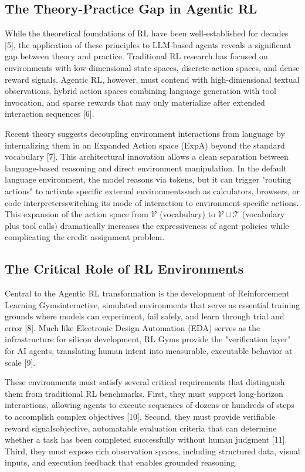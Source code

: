 \subsection{The Theory-Practice Gap in Agentic RL}

While the theoretical foundations of RL have been well-established for decades [5], the application of these principles to LLM-based agents reveals a significant gap between theory and practice. Traditional RL research has focused on environments with low-dimensional state spaces, discrete action spaces, and dense reward signals. Agentic RL, however, must contend with high-dimensional textual observations, hybrid action spaces combining language generation with tool invocation, and sparse rewards that may only materialize after extended interaction sequences [6].

Recent theory suggests decoupling environment interactions from language by internalizing them in an Expanded Action space (ExpA) beyond the standard vocabulary [7]. This architectural innovation allows a clean separation between language-based reasoning and direct environment manipulation. In the default language environment, the model reasons via tokens, but it can trigger "routing actions" to activate specific external environmentssuch as calculators, browsers, or code interpretersswitching its mode of interaction to environment-specific actions. This expansion of the action space from $\mathcal{V}$ (vocabulary) to $\mathcal{V} \cup \mathcal{T}$ (vocabulary plus tool calls) dramatically increases the expressiveness of agent policies while complicating the credit assignment problem.

\subsection{The Critical Role of RL Environments}

Central to the Agentic RL transformation is the development of Reinforcement Learning Gymsinteractive, simulated environments that serve as essential training grounds where models can experiment, fail safely, and learn through trial and error [8]. Much like Electronic Design Automation (EDA) serves as the infrastructure for silicon development, RL Gyms provide the "verification layer" for AI agents, translating human intent into measurable, executable behavior at scale [9].

These environments must satisfy several critical requirements that distinguish them from traditional RL benchmarks. First, they must support long-horizon interactions, allowing agents to execute sequences of dozens or hundreds of steps to accomplish complex objectives [10]. Second, they must provide verifiable reward signalsobjective, automatable evaluation criteria that can determine whether a task has been completed successfully without human judgment [11]. Third, they must expose rich observation spaces, including structured data, visual inputs, and execution feedback that enables grounded reasoning.

